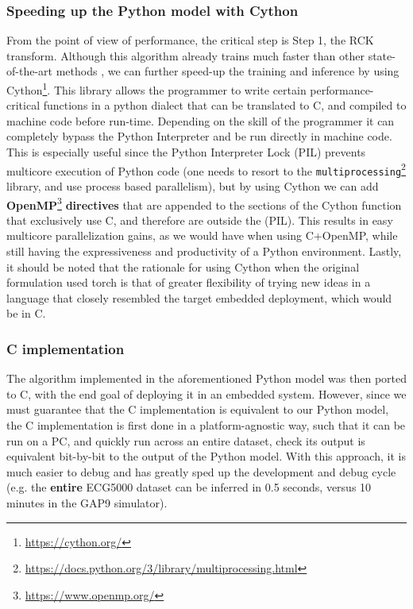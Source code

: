     \subsubsection{Speeding up the Python model with Cython}
    From the point of view of performance, the critical step is Step 1, the RCK transform. Although this algorithm already trains much faster than other state-of-the-art methods \cite{Dempster2023Hydra},
    we can further speed-up the training and inference by using Cython\footnote{\href{https://cython.org/}{https://cython.org/}}. This library allows the programmer to write certain performance-critical functions
    in a python dialect that can be translated to C, and compiled to machine code before run-time. Depending on the skill of the programmer it can completely bypass the Python Interpreter and be run directly in machine code.
    This is especially useful since the Python Interpreter Lock (PIL) prevents multicore execution of Python code (one needs to resort to the \verb|multiprocessing|\footnote{\href{https://docs.python.org/3/library/multiprocessing.html}{https://docs.python.org/3/library/multiprocessing.html}} library, and use process
    based parallelism), but by using Cython we can add \textbf{OpenMP}\footnote{\href{https://www.openmp.org/}{https://www.openmp.org/}} \textbf{directives} that are appended to the sections of the Cython function that exclusively use C, and therefore are outside the (PIL). This results
    in easy multicore parallelization gains, as we would have when using C+OpenMP, while still having the expressiveness and productivity of a Python environment. Lastly, it should be noted that the rationale for using Cython when the original
    formulation used torch is that of greater flexibility of trying new ideas in a language that closely resembled the target embedded deployment, which would be in C.

    \subsubsection{C implementation}
    The algorithm implemented in the aforementioned Python model was then ported to C, with the end goal of deploying it in an embedded system. 
    However, since we must guarantee that the C implementation is equivalent to our Python model, the C implementation is first done in a platform-agnostic way,
    such that it can be run on a PC, and quickly run across an entire dataset, check its output is equivalent bit-by-bit to the output of the Python model. With this approach, 
    it is much easier to debug and has greatly sped up the development and debug cycle (e.g. the \textbf{entire} ECG5000 dataset can be inferred in 0.5 seconds, versus 10 minutes in the GAP9 simulator).
    
